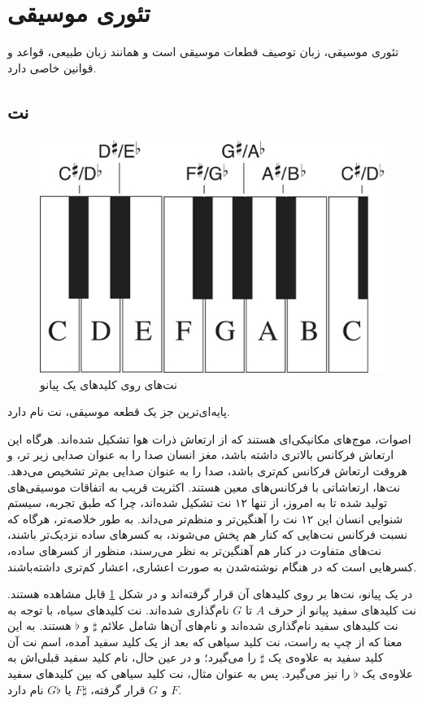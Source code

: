\section{تئوری موسیقی}

تئوری موسیقی، زبان توصیف قطعات موسیقی است و همانند زبان طبیعی، قواعد و قوانین خاصی دارد.

\subsection{نت}

\begin{figure}
	\centering
	\includegraphics[scale=0.4]{figures/pianokeys.jpg}
	\caption {
	نت‌های روی کلیدهای یک پیانو
	}
	\label{fig:pianokeys}
\end{figure}


پایه‌ای‌ترین جز یک قطعه موسیقی، نت
نام دارد. 

اصوات، موج‌های مکانیکی‌ای هستند که از ارتعاش ذرات هوا تشکیل شده‌اند. هرگاه این ارتعاش فرکانس بالاتری داشته باشد، مغز انسان صدا را به عنوان صدایی زیر تر، و هروقت ارتعاش فرکانس کم‌تری باشد، صدا را به عنوان صدایی بم‌تر تشخیص می‌دهد.
نت‌ها، ارتعاشاتی با فرکانس‌های معین هستند. اکثریت قریب به اتفاقات موسیقی‌های تولید شده تا به امروز، از تنها ۱۲ نت تشکیل شده‌اند، چرا که طبق تجربه، سیستم شنوایی انسان این ۱۲ نت را آهنگین‌تر و منظم‌تر می‌داند.
به طور خلاصه‌تر،  هرگاه که نسبت فرکانس نت‌هایی که  کنار هم پخش می‌شوند، به کسرهای ساده نزدیک‌تر باشند، نت‌های متفاوت در کنار هم آهنگین‌تر به نظر می‌رسند، منظور از کسرهای ساده، کسرهایی است که در هنگام نوشته‌شدن به صورت اعشاری، اعشار کم‌تری داشته‌باشند.

در یک پیانو، نت‌ها بر روی کلیدهای آن قرار گرفته‌اند و در شکل
\ref{fig:pianokeys}
قابل مشاهده هستند.
نت کلیدهای سفید پیانو از حرف 
$A$
تا
$G$
نام‌گذاری شده‌اند. 
نت کلیدهای سیاه، با توجه به نت کلیدهای سفید نام‌گذاری شده‌اند و نام‌های آن‌ها شامل علائم
$\sharp$
و
$\flat$
هستند. 
به این معنا که از چپ به راست، نت کلید سیاهی که بعد از یک کلید سفید آمده، اسم نت آن کلید سفید به علاوه‌ی یک
$\sharp$
را می‌گیرد؛ و در عین حال، نام کلید سفید قبلی‌اش به علاوه‌ی یک
$\flat$
را نیز می‌گیرد. پس به عنوان مثال، نت کلید سیاهی که بین کلیدهای سفید 
$F$
و 
$G$
قرار گرفته، 
$F\sharp$
یا
$G\flat$
نام دارد.

